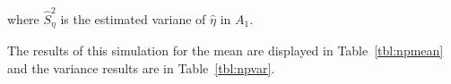 \documentclass[12pt]{article}
\begin{document}
where $\hat S^2_\eta$ is the estimated variane of $\hat \eta$ in $A_1$.

The results of this simulation for the mean are displayed in
Table~\ref{tbl:npmean} and the variance results are in Table~\ref{tbl:npvar}.
\end{document}
